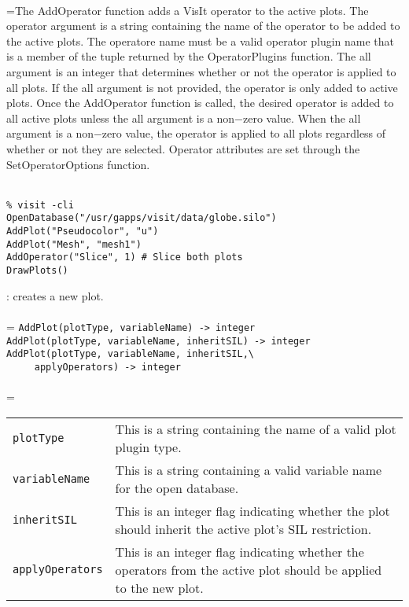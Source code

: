 \documentclass[10pt,a4paper]{report}
\begin{document}
 \\ 
\hangindent=\parindent The AddOperator function adds a VisIt operator to the active plots. The operator argument is a string containing the name of the operator to be added to the active plots. The operatore name must be a valid operator plugin name that is a member of the tuple returned by the OperatorPlugins function. The all argument is an integer that determines whether or not the operator is applied to all plots. If the all argument is not provided, the operator is only added to active plots. Once the AddOperator function is called, the desired operator is added to all active plots unless the all argument is a non$-$zero value. When the all argument is a non$-$zero value, the operator is applied to all plots regardless of whether or not they are selected. Operator attributes are set through the SetOperatorOptions function. \\[-3mm] 

\\[-6mm]
\begin{verbatim}% visit -cli
OpenDatabase("/usr/gapps/visit/data/globe.silo")
AddPlot("Pseudocolor", "u")
AddPlot("Mesh", "mesh1")
AddOperator("Slice", 1) # Slice both plots
DrawPlots()
\end{verbatim}
\newpage


{}
: creates a new plot.\\[-3mm]

 \\ 
\hangindent=\parindent 
\verb!AddPlot(plotType, variableName) -> integer!\\ 
\verb!AddPlot(plotType, variableName, inheritSIL) -> integer!\\
\verb!AddPlot(plotType, variableName, inheritSIL,\ ! \\ 
\verb!     applyOperators) -> integer!\\ [-3mm]

 \\ 
\hangindent=\parindent 
\begin{tabular}{lp{9cm}}
\verb!plotType! & This is a string containing the name of a valid plot plugin type. \\
\verb!variableName ! & This is a string containing a valid variable name for the open database. \\
\verb!inheritSIL! & This is an integer flag indicating whether the plot should inherit the active plot's SIL restriction. \\
\verb!applyOperators! & This is an integer flag indicating whether the operators from the active plot should be applied to the new plot. \\
\end{tabular} \\[-2mm]
\end{document}
